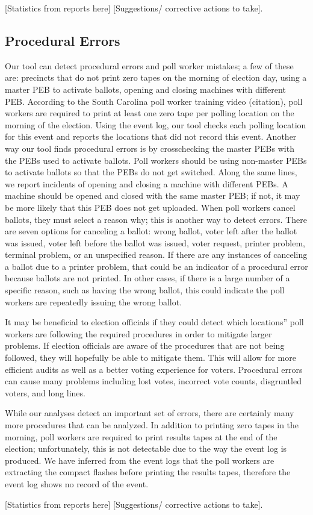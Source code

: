 [Statistics from reports here] [Suggestions/ corrective actions to take].  

\subsection{Procedural Errors}
Our tool can detect procedural errors and poll worker mistakes; a few of these are: precincts that do not print zero tapes on the morning of election day, using a master PEB to activate ballots, opening and closing machines with different PEB.  According to the South Carolina poll worker training video (citation), poll workers are required to print at least one zero tape per polling location on the morning of the election.  Using the event log, our tool checks each polling location for this event and reports the locations that did not record this event.  Another way our tool finds procedural errors is by crosschecking the master PEBs with the PEBs used to activate ballots.  Poll workers should be using non-master PEBs to activate ballots so that the PEBs do not get switched.  Along the same lines, we report incidents of opening and closing a machine with different PEBs.  A machine should be opened and closed with the same master PEB; if not, it may be more likely that this PEB does not get uploaded.   When poll workers cancel ballots, they must select a reason why; this is another way to detect errors.  There are seven options for canceling a ballot: wrong ballot, voter left after the ballot was issued, voter left before the ballot was issued, voter request, printer problem, terminal problem, or an unspecified reason.  If there are any instances of canceling a ballot due to a printer problem, that could be an indicator of a procedural error because ballots are not printed.  In other cases, if there is a large number of a specific reason, such as having the wrong ballot, this could indicate the poll workers are repeatedly issuing the wrong ballot.  

It may be beneficial to election officials if they could detect which locations'' poll workers are following the required procedures in order to mitigate larger problems.  If election officials are aware of the procedures that are not being followed, they will hopefully be able to mitigate them.  This will allow for more efficient audits as well as a better voting experience for voters.  Procedural errors can cause many problems including lost votes, incorrect vote counts, disgruntled voters, and long lines.

While our analyses detect an important set of errors, there are certainly many more procedures that can be analyzed.  In addition to printing zero tapes in the morning, poll workers are required to print results tapes at the end of the election; unfortunately, this is not detectable due to the way the event log is produced.  We have inferred from the event logs that the poll workers are extracting the compact flashes before printing the results tapes, therefore the event log shows no record of the event.  

[Statistics from reports here] [Suggestions/ corrective actions to take].  

